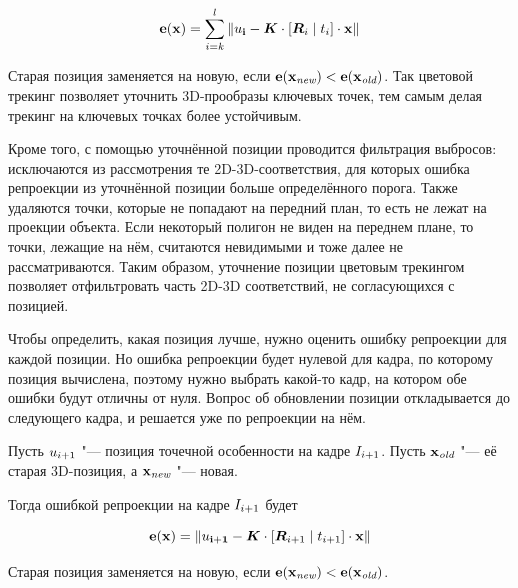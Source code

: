 \begin{equation}
\label{eqn:sum_reproj}
\mathbf{e}( \mathbf{x} ) = \sum\limits_{i = k}^l \| \mathbf{\mathnormal{u}_i} - \bm{K} \cdot
[\bm{R}_i \mid \mathnormal{t}_i] \cdot \mathbf{x} \|
\end{equation}

Старая позиция заменяется на новую, если $\mathbf{e}( \mathbf{x_{\text{\it new}}} ) < \mathbf{e}( \mathbf{x_{\text {\it old}}} )$.
Так цветовой трекинг позволяет уточнить 3D-прообразы ключевых точек, тем самым
делая трекинг на ключевых точках более устойчивым.

Кроме того, с помощью уточнённой позиции проводится фильтрация выбросов:
исключаются из рассмотрения те 2D-3D-соответствия, для которых ошибка
репроекции из уточнённой позиции больше определённого порога.
Также удаляются точки, которые не попадают на передний план, то есть не лежат
на проекции объекта.
Если некоторый полигон не виден на переднем плане, то точки, лежащие на нём,
считаются невидимыми и тоже далее не рассматриваются.
Таким образом, уточнение позиции цветовым трекингом позволяет отфильтровать
часть 2D-3D соответствий, не согласующихся с позицией.


Чтобы определить, какая позиция лучше, нужно оценить ошибку репроекции для
каждой позиции.
Но ошибка репроекции будет нулевой для кадра, по которому позиция вычислена,
поэтому нужно выбрать какой-то кадр, на котором обе ошибки будут отличны от
нуля.
Вопрос об обновлении позиции откладывается до следующего кадра, и решается уже
по репроекции на нём.

Пусть $\mathnormal{u}_{i + 1}$ "--- позиция точечной особенности на кадре $I_{i +
1}$.
Пусть $\mathbf{x_{\text {\it old}}}$ "--- её старая 3D-позиция, а $\mathbf{x_{\text{\it new}}}$ "--- новая. 

Тогда ошибкой репроекции на кадре $I_{i + 1}$ будет

\begin{equation}
\label{eqn:err_reproj}
\mathbf{e}( \mathbf{x} ) = \| \mathbf{\mathnormal{u}_{i + 1}} - \bm{K} \cdot
[\bm{R}_{i + 1} \mid \mathnormal{t}_{i + 1}] \cdot \mathbf{x} \|
\end{equation}

Старая позиция заменяется на новую, если $\mathbf{e}( \mathbf{x_{\text{\it new}}} ) < \mathbf{e}( \mathbf{x_{\text {\it old}}} )$.
